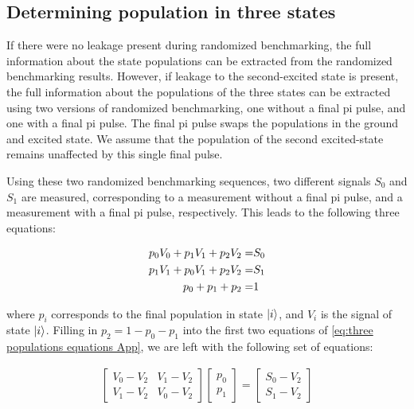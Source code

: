     \subsection{Determining population in three states}
      \label{ssec:Determining population in three states}
      If there were no leakage present during randomized benchmarking, the full information about the state populations can be extracted from the randomized benchmarking results. However, if leakage to the second-excited state is present, the full information about the populations of the three states can be extracted using two versions of randomized benchmarking, one without a final pi pulse, and one with a final pi pulse. The final pi pulse swaps the populations in the ground and excited state. We assume that the population of the second excited-state remains unaffected by this single final pulse.

      Using these two randomized benchmarking sequences, two different signals $S_0$ and $S_1$ are measured, corresponding to a measurement without a final pi pulse, and a measurement with a final pi pulse, respectively. This leads to the following three equations:

      \begin{align}
        p_0 V_0 + p_1 V_1 + p_2 V_2 = & S_0 \notag\\
        p_1 V_1 + p_0 V_1 + p_2 V_2 = & S_1 \notag\\
        p_0 + p_1 + p_2 = &   1
        \label{eq:three populations equations App}
      \end{align}

      where $p_i$ corresponds to the final population in state $\ket{i}$, and $V_i$ is the signal of state $\ket{i}$.  Filling in $p_2 = 1 - p_0 - p_1$ into the first two equations of \ref{eq:three populations equations App}, we are left with the following set of equations:

      \begin{align}
        \begin{bmatrix}
          V_0 - V_2 & V_1 - V_2 \\
          V_1 - V_2 & V_0 - V_2
        \end{bmatrix}
        \begin{bmatrix}
          p_0 \\
          p_1
        \end{bmatrix}
        =
        \begin{bmatrix}
          S_0 - V_2 \\
          S_1 - V_2
        \end{bmatrix}
      \end{align}

